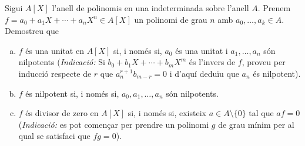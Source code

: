 \documentclass[../main.tex]{subfiles}
\begin{document}
\begin{exercici}
\label{esal28} Sigui $A[X]$ l'anell de polinomis en una indeterminada sobre l'anell $A$. Prenem $f=a_0+a_1X+\cdots+a_nX^n\in A[X]$ un polinomi de grau $n$ amb $a_0,\ldots,a_k\in A$. Demostreu que 
\begin{enumerate}[(a)]
    \item $f$ és una unitat en $A[X]$ si, i només si, $a_0$ és una unitat i $a_1,\ldots,a_n$ són nilpotents (\textit{Indicació:} Si $b_0+b_1X+\cdots+b_mX^m$ és l'invers de $f$, proveu per inducció respecte de $r$ que $a_n^{r+1}b_{m-r} = 0$ i d'aquí deduïu que $a_n$ és nilpotent).
    \item $f$ és nilpotent si, i només si, $a_0,a_1,\ldots,a_n$ són nilpotents.
    \item $f$ és divisor de zero en $A[X]$ si, i només si, existeix $a\in A\setminus\{0\}$ tal que $af = 0$ (\textit{Indicació:} es pot començar per prendre un polinomi $g$ de grau mínim per al qual se satisfaci que $fg= 0$).
\end{enumerate}
\end{exercici}
\end{document}

